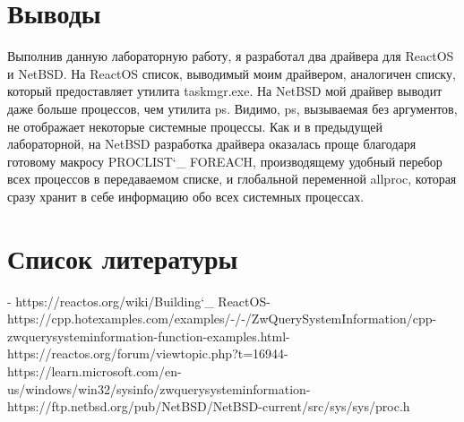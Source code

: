 \documentclass[a4paper, 14pt]{extarticle}
\begin{document}
\section{Выводы} \label{sec:Conclusion}
Выполнив данную лабораторную работу, я разработал два драйвера для ReactOS и NetBSD. На ReactOS список, выводимый моим драйвером, аналогичен списку, который предоставляет утилита taskmgr.exe. На NetBSD мой драйвер выводит даже больше процессов, чем утилита ps. Видимо, ps, вызываемая без аргументов, не отображает некоторые системные процессы. Как и в предыдущей лабораторной, на NetBSD разработка драйвера оказалась проще благодаря готовому макросу PROCLIST\char`_ FOREACH, производящему удобный перебор всех процессов в передаваемом списке, и глобальной переменной allproc, которая сразу хранит в себе информацию обо всех системных процессах.
\pagebreak

\section{Список литературы} \label{sec:Literature}
\begin{flushleft}
[1] - https://reactos.org/wiki/Building\char`_ ReactOS\newline
[2] - https://cpp.hotexamples.com/examples/-/-/ZwQuerySystemInformation/cpp-zwquerysysteminformation-function-examples.html\newline
[3] - https://reactos.org/forum/viewtopic.php?t=16944\newline
[4] - https://learn.microsoft.com/en-us/windows/win32/sysinfo/zwquerysysteminformation\newline
[5] - https://ftp.netbsd.org/pub/NetBSD/NetBSD-current/src/sys/sys/proc.h
\end{flushleft}
\end{document}

